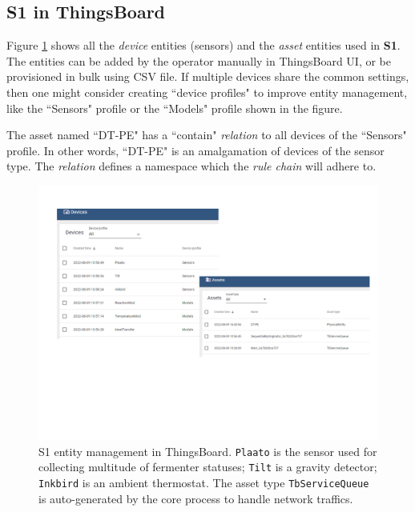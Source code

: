 \subsection{S1 in ThingsBoard}
Figure \ref{fig:s1_tb_entity} shows all the \textit{device} entities (sensors) and the \textit{asset} entities used in \textbf{S1}. The entities can be added by the operator manually in ThingsBoard UI, or be provisioned in bulk using CSV file. If multiple devices share the common settings, then one might consider creating ``device profiles" to improve entity management, like the ``Sensors" profile or the ``Models" profile shown in the figure. 

The asset named ``DT-PE" has a ``contain" \textit{relation} to all devices of the ``Sensors" profile. In other words, ``DT-PE" is an amalgamation of devices of the sensor type. The \textit{relation} defines a namespace which the \textit{rule chain} will adhere to.

\begin{figure}[hbt!]
  \centering
  \includegraphics[scale=0.6]{figures/s1_tb_entity.pdf}
  \caption[S1 entity management in ThingsBoard]{S1 entity management in ThingsBoard. \texttt{Plaato} is the sensor used for collecting multitude of fermenter statuses; \texttt{Tilt} is a gravity detector; \texttt{Inkbird} is an ambient thermostat. The asset type \texttt{TbServiceQueue} is auto-generated  by the core process to handle network traffics.}
  \label{fig:s1_tb_entity}
\end{figure}

